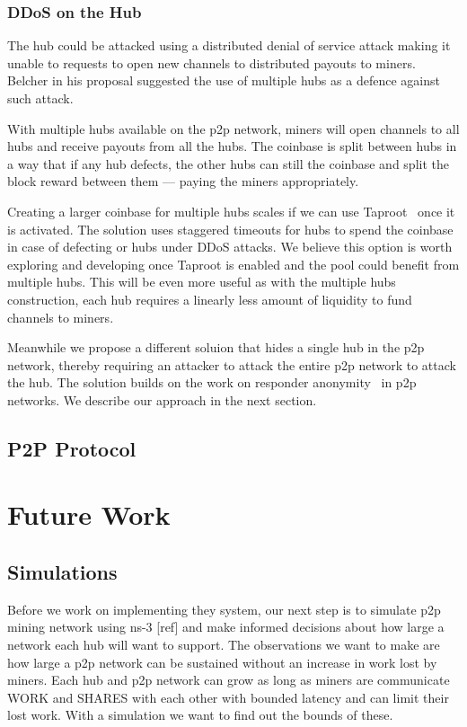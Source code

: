 \documentclass{article}
\begin{document}
\subsubsection{DDoS on the Hub}\label{ref:ddos-attack}

The hub could be attacked using a distributed denial of service attack
making it unable to requests to open new channels to distributed
payouts to miners. Belcher in his proposal suggested the use of
multiple hubs as a defence against such attack.

With multiple hubs available on the p2p network, miners will open
channels to all hubs and receive payouts from all the hubs. The
coinbase is split between hubs in a way that if any hub defects, the
other hubs can still the coinbase and split the block reward between
them --- paying the miners appropriately.

Creating a larger coinbase for multiple hubs scales if we can use
Taproot~\cite{bip340,bip341, bip342} once it is activated. The
solution uses staggered timeouts for hubs to spend the coinbase in
case of defecting or hubs under DDoS attacks. We believe this option
is worth exploring and developing once Taproot is enabled and the pool
could benefit from multiple hubs. This will be even more useful as
with the multiple hubs construction, each hub requires a linearly less
amount of liquidity to fund channels to miners.

Meanwhile we propose a different soluion that hides a single hub in
the p2p network, thereby requiring an attacker to attack the entire
p2p network to attack the hub. The solution builds on the work on
responder anonymity~\cite{responder-anonymity:file-sharing,
  liu2010rumor, responder-anonymity:p2p} in p2p networks. We describe
our approach in the next section.

\subsection{P2P Protocol}\label{sec:p2p-protocol}

\section{Future Work}

\subsection{Simulations}
Before we work on implementing they system, our next step is to
simulate p2p mining network using ns-3 [ref] and make informed
decisions about how large a network each hub will want to support. The
observations we want to make are how large a p2p network can be
sustained without an increase in work lost by miners. Each hub and p2p
network can grow as long as miners are communicate WORK and SHARES
with each other with bounded latency and can limit their lost
work. With a simulation we want to find out the bounds of these.
\end{document}
